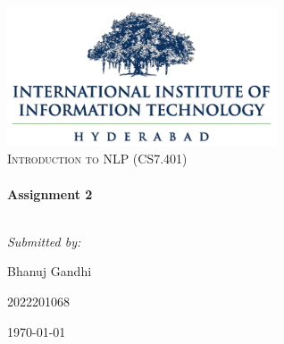 \begin{titlepage}
    \centering

    \includegraphics[width=0.6\textwidth]{img/collegelogo.png}\\[4cm]
    
    \textsc{\LARGE Introduction to NLP (CS7.401)}\\[0.7cm]

    \noindent\makebox[\linewidth]{\rule{.7\paperwidth}{.6pt}}\\[0.7cm]
    { \huge \bfseries Assignment 2}\\[0.25cm]
    \noindent\makebox[\linewidth]{\rule{.7\paperwidth}{.6pt}}\\[0.7cm]
    \vfill

    {\Large\itshape Submitted by:\par}
    {\Large Bhanuj Gandhi\par 2022201068\par\vspace{0.5cm}\today\par}
    \vfill
\end{titlepage}


